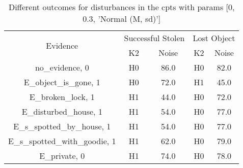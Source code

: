\begin{table}\begin{tabular}{c|cc|cc}\toprule\multirow{2}{*}{Evidence} & \multicolumn{2}{c}{Successful Stolen} & \multicolumn{2}{c}{Lost Object} \\& {K2} & {Noise} & {K2} & {Noise} \\\midrule
no\_evidence, 0 & \cellcolor{Bittersweet}H0&\cellcolor{Bittersweet}86.0&\cellcolor{Bittersweet}H0&\cellcolor{Bittersweet}82.0\\E\_object\_is\_gone, 1 & \cellcolor{Bittersweet}H0&\cellcolor{Bittersweet}72.0&\cellcolor{Bittersweet}H1&\cellcolor{Bittersweet}45.0\\E\_broken\_lock, 1 & \cellcolor{Bittersweet}H1&\cellcolor{Bittersweet}44.0&\cellcolor{Bittersweet}H0&\cellcolor{Bittersweet}72.0\\E\_disturbed\_house, 1 & \cellcolor{Bittersweet}H1&\cellcolor{Bittersweet}54.0&\cellcolor{Bittersweet}H0&\cellcolor{Bittersweet}77.0\\E\_s\_spotted\_by\_house, 1 & \cellcolor{Bittersweet}H1&\cellcolor{Bittersweet}54.0&\cellcolor{Bittersweet}H0&\cellcolor{Bittersweet}77.0\\E\_s\_spotted\_with\_goodie, 1 & \cellcolor{Bittersweet}H1&\cellcolor{Bittersweet}62.0&\cellcolor{Bittersweet}H0&\cellcolor{Bittersweet}79.0\\E\_private, 0 & \cellcolor{Bittersweet}H1&\cellcolor{Bittersweet}74.0&\cellcolor{Bittersweet}H0&\cellcolor{Bittersweet}78.0\\\bottomrule\end{tabular}\caption{Different outcomes for disturbances in the cpts with params [0, 0.3, 'Normal (M, sd)']}\end{table}